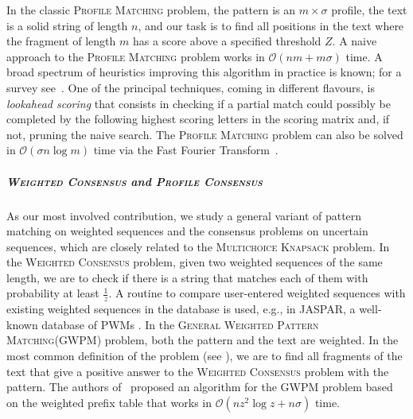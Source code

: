 \documentclass{article}
\theoremstyle{plain}
\theoremstyle{definition}
\newcommand{\MK}{\textsc{Multichoice Knapsack}\xspace}
\newcommand{\PM}{\textsc{Profile Matching}\xspace}
\newcommand{\GWPM}{\textsc{GWPM}\xspace}
\newcommand{\GWPMFull}{\textsc{General Weighted Pattern Matching}\xspace}
\newcommand{\WC}{\textsc{Weighted Consensus}\xspace}
\newcommand{\PC}{\textsc{Profile Consensus}\xspace}
\newcommand{\Oh}{\mathcal{O}}
\newcommand{\fr}{\ensuremath{\frac1z}}
\begin{document}
  In the classic \PM problem, the pattern is an $m \times \sigma$ profile, the text is a solid string of length $n$, and
  our task is to find all positions in the text where the fragment of length $m$ has a score above a specified
  threshold $Z$.
  A naive approach to the \PM problem works in $\Oh(nm+m\sigma)$ time.
  A broad spectrum of heuristics improving this algorithm in practice is known; for a survey see~\cite{DBLP:journals/tcs/PizziU08}.
  One of the principal techniques, coming in different flavours, is \emph{lookahead scoring} that consists in checking if a partial match
  could possibly be completed by the following highest scoring letters in the scoring matrix and, if not, pruning the
  naive search.
  The \PM problem can also be solved in $\Oh(\sigma n \log m)$ time via the Fast Fourier Transform~\cite{DBLP:journals/jcb/RajasekaranJS02}.
  
  \subparagraph*{\WC and \PC}
  As our most involved contribution, we study a general variant of pattern matching on weighted sequences
  and the consensus problems on uncertain sequences, which are closely related to the \MK problem.
  In the \WC problem, given two weighted sequences of the same length, we are to check if there is
  a string that matches each of them with probability at least \fr.
  A routine to compare user-entered weighted sequences with existing weighted sequences in the database is used,
  e.g., in JASPAR, a well-known database of PWMs \cite{JASPAR}.
  In the \GWPMFull (\GWPM) problem, both the pattern and the text are weighted.
  In the most common definition of the problem (see \cite{DBLP:conf/cwords/BartonP15,costas_weighted_suffix_tree_j}),
  we are to find all fragments of the text that give a positive answer to the \WC problem with the pattern.
  The authors of~\cite{DBLP:conf/cwords/BartonP15} proposed an algorithm for the \GWPM problem based on the weighted prefix table
  that works in $\Oh(n z^2 \log z + n\sigma)$ time.
\end{document}
